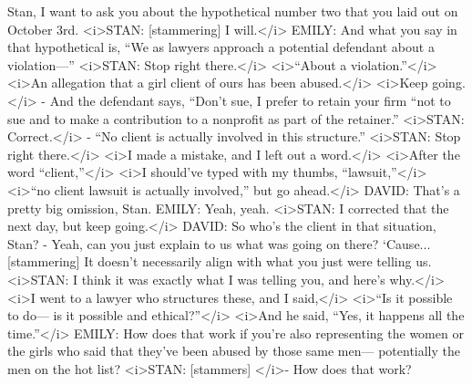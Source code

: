\begin{itemize}
\begin{itemize}
    Stan, I want to ask you about the hypothetical number two that you
    laid out on October 3rd. \textless{}i\textgreater{}STAN:
    {[}stammering{]} I will.\textless{}/i\textgreater{} EMILY: And what
    you say in that hypothetical is, ``We as lawyers approach a
    potential defendant about a violation---''
    \textless{}i\textgreater{}STAN: Stop right
    there.\textless{}/i\textgreater{} \textless{}i\textgreater{}``About
    a violation.''\textless{}/i\textgreater{}
    \textless{}i\textgreater{}An allegation that a girl client of ours
    has been abused.\textless{}/i\textgreater{}
    \textless{}i\textgreater{}Keep going.\textless{}/i\textgreater{} -
    And the defendant says, ``Don't sue, I prefer to retain your firm
    ``not to sue and to make a contribution to a nonprofit as part of
    the retainer.'' \textless{}i\textgreater{}STAN:
    Correct.\textless{}/i\textgreater{} - ``No client is actually
    involved in this structure.'' \textless{}i\textgreater{}STAN: Stop
    right there.\textless{}/i\textgreater{} \textless{}i\textgreater{}I
    made a mistake, and I left out a word.\textless{}/i\textgreater{}
    \textless{}i\textgreater{}After the word
    ``client,''\textless{}/i\textgreater{} \textless{}i\textgreater{}I
    should've typed with my thumbs,
    ``lawsuit,''\textless{}/i\textgreater{}
    \textless{}i\textgreater{}``no client lawsuit is actually
    involved,'' but go ahead.\textless{}/i\textgreater{} DAVID: That's a
    pretty big omission, Stan. EMILY: Yeah, yeah.
    \textless{}i\textgreater{}STAN: I corrected that the next day, but
    keep going.\textless{}/i\textgreater{} DAVID: So who's the client in
    that situation, Stan? - Yeah, can you just explain to us what was
    going on there? `Cause... {[}stammering{]} It doesn't necessarily
    align with what you just were telling us.
    \textless{}i\textgreater{}STAN: I think it was exactly what I was
    telling you, and here's why.\textless{}/i\textgreater{}
    \textless{}i\textgreater{}I went to a lawyer who structures these,
    and I said,\textless{}/i\textgreater{}
    \textless{}i\textgreater{}``Is it possible to do--- is it possible
    and ethical?''\textless{}/i\textgreater{}
    \textless{}i\textgreater{}And he said, ``Yes, it happens all the
    time.''\textless{}/i\textgreater{} EMILY: How does that work if
    you're also representing the women or the girls who said that
    they've been abused by those same men--- potentially the men on the
    hot list? \textless{}i\textgreater{}STAN: {[}stammers{]}
    \textless{}/i\textgreater{}- How does that work?

\end{itemize}
\end{itemize}
